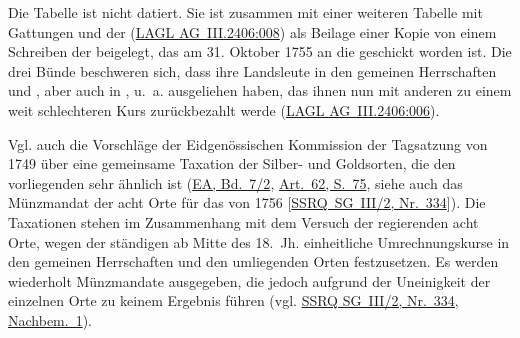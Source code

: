\documentclass[10pt,twoside]{article}
\begin{document}
\def\volume{XIV. Abteilung: Die Rechtsquellen des Kantons St. Gallen, Dritter Teil: Die Landschaften und Landstädte, Band 4: Die Rechtsquellen der
     Region Werdenberg: Grafschaft Werdenberg und Herrschaft Wartau, Freiherrschaft Sax-Forstegg und Herrschaft Hohensax-Gams von Sibylle Malamud, 2019.}
\def\volid{\url{https://www.ssrq-sds-fds.ch/online/tei/SG/SSRQ_SG_III_4_235.xml}}
\linenumbers				%
\normalsize					%
\thispagestyle{firstpage}
\sloppy
\setcounter{subsection}{234}  %
\fussy
{}

\begin{introlist}

         \item {
            Die Tabelle ist nicht datiert. Sie ist zusammen mit einer weiteren Tabelle mit
               Gattungen und  der  (\href{https://archivverzeichnis.gl.ch/home/\#/content/0d3e5bef19054808b4f9ecec4219506f}{LAGL AG III.2406:008}) als Beilage einer Kopie von
               einem Schreiben der  beigelegt, das
               am 31. Oktober 1755 an die  geschickt worden ist.
               Die drei Bünde beschweren sich, dass ihre Landsleute in den gemeinen
               Herrschaften  und , aber auch in , 
               u. a.  ausgeliehen haben, das ihnen nun
               mit anderen  zu einem weit schlechteren
               Kurs zurückbezahlt werde (\href{https://archivverzeichnis.gl.ch/home/\#/content/e6033619e02846db817e2d60624741b7}{LAGL AG III.2406:006}).


}
         \item {Vgl. auch die Vorschläge der Eidgenössischen Kommission der Tagsatzung von 1749 über eine gemeinsame Taxation der Silber- und
               Goldsorten, die den vorliegenden  sehr
               ähnlich ist (\href{                   http://permalink.snl.ch/bib/chbsg000143824}{EA, Bd. 7/2}, \href{http://digital.ub.uni-duesseldorf.de/periodical/pageview/1310151}{Art. 62, S. 75}, siehe auch das
               Münzmandat der acht Orte für das  von 1756 [\href{https://www.ssrq-sds-fds.ch/online/SG_III_2/index.html\#p_1117}{SSRQ~SG~III/2, Nr. 334}]). Die Taxationen stehen im
               Zusammenhang mit dem Versuch der regierenden acht Orte, wegen der ständigen
                ab Mitte des 18. Jh. einheitliche
               Umrechnungskurse in den gemeinen Herrschaften und den umliegenden Orten
               festzusetzen. Es werden wiederholt Münzmandate ausgegeben, die jedoch aufgrund
               der Uneinigkeit der einzelnen Orte zu keinem Ergebnis führen (vgl. \href{https://www.ssrq-sds-fds.ch/online/SG_III_2/index.html\#p_1117}{SSRQ SG III/2, Nr. 334, Nachbem. 1}). 


}
\end{introlist}
\end{document}
